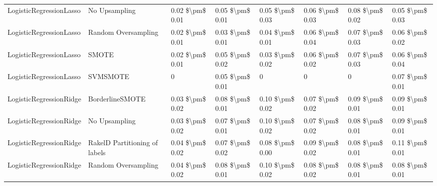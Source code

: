 \begin{tabular}{llllllll}
        LogisticRegressionLasso &                 No Upsampling & 0.02 \$\textbackslash pm\$ 0.01 &           0.05 \$\textbackslash pm\$ 0.01 &       0.05 \$\textbackslash pm\$ 0.03 &        0.06 \$\textbackslash pm\$ 0.03 &                         0.08 \$\textbackslash pm\$ 0.02 &     0.05 \$\textbackslash pm\$ 0.03 \\
        LogisticRegressionLasso &           Random Oversampling & 0.02 \$\textbackslash pm\$ 0.01 &           0.03 \$\textbackslash pm\$ 0.01 &       0.04 \$\textbackslash pm\$ 0.01 &        0.06 \$\textbackslash pm\$ 0.04 &                         0.07 \$\textbackslash pm\$ 0.03 &     0.06 \$\textbackslash pm\$ 0.02 \\
        LogisticRegressionLasso &                         SMOTE & 0.02 \$\textbackslash pm\$ 0.01 &           0.05 \$\textbackslash pm\$ 0.02 &       0.03 \$\textbackslash pm\$ 0.02 &        0.06 \$\textbackslash pm\$ 0.02 &                         0.07 \$\textbackslash pm\$ 0.03 &     0.06 \$\textbackslash pm\$ 0.04 \\
        LogisticRegressionLasso &                      SVMSMOTE &               0 &           0.05 \$\textbackslash pm\$ 0.01 &                     0 &                      0 &                                       0 &     0.07 \$\textbackslash pm\$ 0.01 \\
        LogisticRegressionRidge &               BorderlineSMOTE & 0.03 \$\textbackslash pm\$ 0.02 &           0.08 \$\textbackslash pm\$ 0.01 &       0.10 \$\textbackslash pm\$ 0.02 &        0.07 \$\textbackslash pm\$ 0.02 &                         0.09 \$\textbackslash pm\$ 0.01 &     0.09 \$\textbackslash pm\$ 0.01 \\
        LogisticRegressionRidge &                 No Upsampling & 0.03 \$\textbackslash pm\$ 0.02 &           0.07 \$\textbackslash pm\$ 0.01 &       0.10 \$\textbackslash pm\$ 0.02 &        0.07 \$\textbackslash pm\$ 0.02 &                         0.08 \$\textbackslash pm\$ 0.01 &     0.09 \$\textbackslash pm\$ 0.01 \\
        LogisticRegressionRidge & RakelD Partitioning of labels & 0.04 \$\textbackslash pm\$ 0.02 &           0.07 \$\textbackslash pm\$ 0.02 &       0.08 \$\textbackslash pm\$ 0.00 &        0.09 \$\textbackslash pm\$ 0.02 &                         0.08 \$\textbackslash pm\$ 0.01 &     0.11 \$\textbackslash pm\$ 0.01 \\
        LogisticRegressionRidge &           Random Oversampling & 0.04 \$\textbackslash pm\$ 0.02 &           0.08 \$\textbackslash pm\$ 0.01 &       0.10 \$\textbackslash pm\$ 0.02 &        0.08 \$\textbackslash pm\$ 0.02 &                         0.08 \$\textbackslash pm\$ 0.01 &     0.08 \$\textbackslash pm\$ 0.01 \\

\end{tabular}
